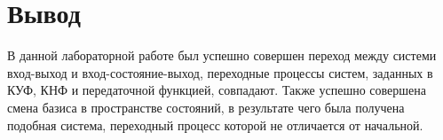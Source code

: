 \documentclass[a4paper,12pt,russian]{article} %
\begin{document}
\section{Вывод}
В данной лабораторной работе был успешно совершен переход между системи вход-выход и вход-состояние-выход, переходные процессы систем, заданных в КУФ, КНФ и передаточной функцией, совпадают. Также успешно совершена смена базиса в пространстве состояний, в результате чего была получена подобная система, переходный процесс которой не отличается от начальной.
\end{document}
